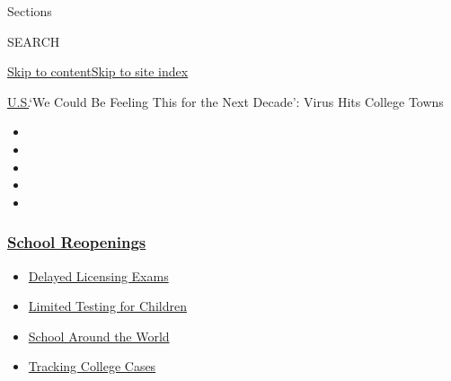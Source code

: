 Sections

SEARCH

\protect\hyperlink{site-content}{Skip to
content}\protect\hyperlink{site-index}{Skip to site index}

\href{/section/us}{U.S.}\textbar{}`We Could Be Feeling This for the Next
Decade': Virus Hits College Towns

\begin{itemize}
\item
\item
\item
\item
\item
\end{itemize}

\hypertarget{school-reopenings}{%
\subsubsection{\texorpdfstring{\href{https://www.nytimes3xbfgragh.onion/spotlight/schools-reopening?name=styln-coronavirus-schools-reopening\&region=TOP_BANNER\&block=storyline_menu_recirc\&action=click\&pgtype=Article\&impression_id=dcfc4a40-f2b7-11ea-8923-77b70e4903c7\&variant=undefined}{School
Reopenings}}{School Reopenings}}\label{school-reopenings}}

\begin{itemize}
\tightlist
\item
  \href{https://www.nytimes3xbfgragh.onion/2020/09/04/us/bar-exam-coronavirus.html?name=styln-coronavirus-schools-reopening\&region=TOP_BANNER\&block=storyline_menu_recirc\&action=click\&pgtype=Article\&impression_id=dcfc4a41-f2b7-11ea-8923-77b70e4903c7\&variant=undefined}{Delayed
  Licensing Exams}
\item
  \href{https://www.nytimes3xbfgragh.onion/2020/09/08/upshot/children-testing-shortfalls-virus.html?name=styln-coronavirus-schools-reopening\&region=TOP_BANNER\&block=storyline_menu_recirc\&action=click\&pgtype=Article\&impression_id=dcfc7150-f2b7-11ea-8923-77b70e4903c7\&variant=undefined}{Limited
  Testing for Children}
\item
  \href{https://www.nytimes3xbfgragh.onion/2020/09/01/world/schools-reopen-globe-students.html?name=styln-coronavirus-schools-reopening\&region=TOP_BANNER\&block=storyline_menu_recirc\&action=click\&pgtype=Article\&impression_id=dcfc7151-f2b7-11ea-8923-77b70e4903c7\&variant=undefined}{School
  Around the World}
\item
  \href{https://www.nytimes3xbfgragh.onion/interactive/2020/us/covid-college-cases-tracker.html?name=styln-coronavirus-schools-reopening\&region=TOP_BANNER\&block=storyline_menu_recirc\&action=click\&pgtype=Article\&impression_id=dcfc7152-f2b7-11ea-8923-77b70e4903c7\&variant=undefined}{Tracking
  College Cases}
\end{itemize}

